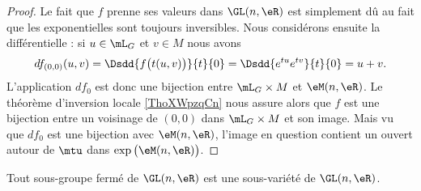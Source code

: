 \begin{proof}
    Le fait que \( f\) prenne ses valeurs dans \( \GL(n,\eR)\) est simplement dû au fait que les exponentielles sont toujours inversibles. Nous considérons ensuite la différentielle : si \( u\in \mL_G\) et \( v\in M\) nous avons
    \begin{equation}
        df_{(0,0)}(u,v)=\Dsdd{ f\big( t(u,v) \big) }{t}{0}=\Dsdd{  e^{tu} e^{tv} }{t}{0}=u+v.
    \end{equation}
    L'application \( df_0\) est donc une bijection entre \( \mL_G\times M\) et \( \eM(n,\eR)\). Le théorème d'inversion locale \ref{ThoXWpzqCn} nous assure alors que \( f\) est une bijection entre un voisinage de \( (0,0)\) dans \( \mL_G\times M\) et son image. Mais vu que \( df_0\) est une bijection avec \( \eM(n,\eR)\), l'image en question contient un ouvert autour de \( \mtu\) dans \( \exp\big( \eM(n,\eR) \big)\).
\end{proof}

\begin{theorem}       \label{ThoOBriEoe}
    Tout sous-groupe fermé de \( \GL(n,\eR)\) est une sous-variété de \( \GL(n,\eR)\).
\end{theorem}

